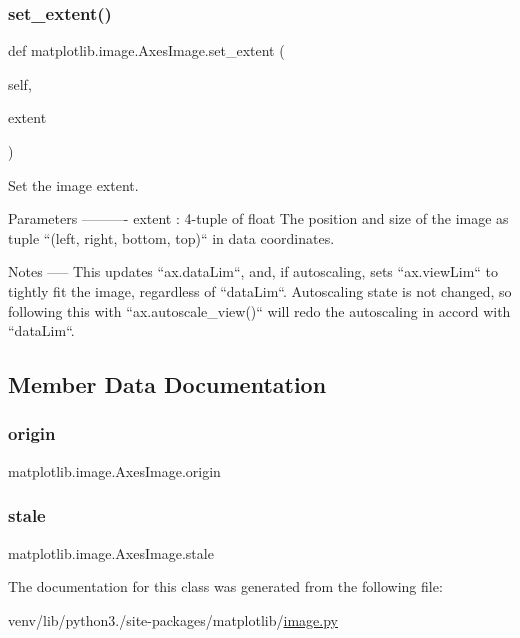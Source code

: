 \subsubsection{\texorpdfstring{set\+\_\+extent()}{set\_extent()}}
{\footnotesize\ttfamily def matplotlib.\+image.\+Axes\+Image.\+set\+\_\+extent (\begin{DoxyParamCaption}\item[{}]{self,  }\item[{}]{extent }\end{DoxyParamCaption})}

\begin{DoxyVerb}Set the image extent.

Parameters
----------
extent : 4-tuple of float
    The position and size of the image as tuple
    ``(left, right, bottom, top)`` in data coordinates.

Notes
-----
This updates ``ax.dataLim``, and, if autoscaling, sets ``ax.viewLim``
to tightly fit the image, regardless of ``dataLim``.  Autoscaling
state is not changed, so following this with ``ax.autoscale_view()``
will redo the autoscaling in accord with ``dataLim``.
\end{DoxyVerb}
 

\subsection{Member Data Documentation}
\mbox{\label{classmatplotlib_1_1image_1_1AxesImage_a5f5dac751a5431dcd62fb896728e0b64}} 
\subsubsection{\texorpdfstring{origin}{origin}}
{\footnotesize\ttfamily matplotlib.\+image.\+Axes\+Image.\+origin}

\mbox{\label{classmatplotlib_1_1image_1_1AxesImage_a882587d5cf3345c199857ff9605fa02c}} 
\subsubsection{\texorpdfstring{stale}{stale}}
{\footnotesize\ttfamily matplotlib.\+image.\+Axes\+Image.\+stale}



The documentation for this class was generated from the following file\+:\begin{DoxyCompactItemize}
\item 
venv/lib/python3./site-\/packages/matplotlib/\hyperlink{image_8py}{image.\+py}\end{DoxyCompactItemize}
